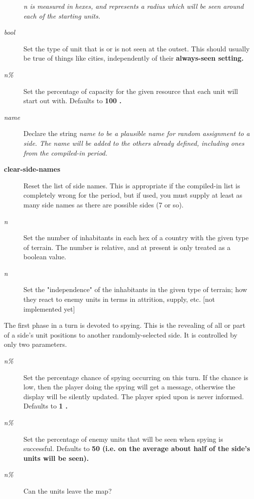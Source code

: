 \begin{description}
\it n \rm%
is measured in hexes,
and represents a radius which will be seen around each of the starting units.
\item[{%
\it bool}]
Set the type of unit that is or is not seen at the outset.
This should usually be true of things like cities, independently of their
%
\bf always-seen \rm%
setting.
\item[{%
\it n\%}]
Set the percentage of capacity for the given resource that each unit will
start out with.  Defaults to %
\bf 100\rm%
.
\item[{%
\it name}]
Declare the string %
\it name \rm%
to be a plausible name for random assignment
to a side.  The name will be added to the others already defined, including
ones from the compiled-in period.
\item[{%
\bf clear-side-names%
\rm }]
Reset the list of side names.  This is appropriate if the compiled-in list
is completely wrong for the period, but if used, you must supply at least
as many side names as there are possible sides (7 or so).
\item[{%
\it n}]
Set the number of inhabitants in each hex of a country with the given type
of terrain.  The number is relative, and at present is only treated as a
boolean value.
\item[{%
\it n}]
Set the "independence" of the inhabitants in the given type of terrain;
how they react to enemy units in terms in attrition, supply, etc. [not implemented yet]
\end{description}\par\noindent
The first phase in a turn is devoted to spying.  This is the revealing of
all or part of a side's unit positions to another randomly-selected side.
It is controlled by only two parameters.
\begin{description}
\item[{%
\it n\%}]
Set the percentage chance of spying occurring on this turn.  If the chance
is low, then the player doing the spying will get a message, otherwise the
display will be silently updated.  The player spied upon is never informed.
Defaults to %
\bf 1\rm%
.
\item[{%
\it n\%}]
Set the percentage of enemy units that will be seen when spying is
successful.  Defaults to %
\bf 50 \rm%
(i.e. on the average about half of the
side's units will be seen).
\end{description}\par\noindent
\begin{description}
\item[{%
\it n\%}]
Can the units leave the map?

\end{description}\par\noindent
